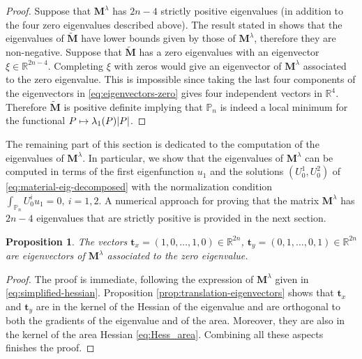 \documentclass[11pt]{article}
\numberwithin{equation}{section}\newtheorem*{jepEnonce}{\jepEnonceTitle}\newenvironment{enonce*}[1]{\def\jepEnonceTitle{#1}\jepEnonce}{\endjepEnonce}\newtheorem*{conj*}{Conjecture}
\def\mto{\mathchoice{\longmapsto}{\mapsto}{\mapsto}{\mapsto}}
\theoremstyle{plain}
\newtheorem{propo}[thm]{Proposition}
\theoremstyle{definition}
\newcommand{\bo}[1]{{\boldsymbol#1}}
\let\Bbb\mathbb
\def\Pp{{\mathbb{P}_n}}
\begin{document}
\begin{proof}
Suppose that $\bo M^\lambda$ has $2n-4$ strictly positive eigenvalues (in addition to the four zero eigenvalues described above). The result stated in \cite[Th.\,4.3.28]{horn-matrix} shows that the eigenvalues of $\widetilde{\bo{M}}$ have lower bounds given by those of $\bo M^\lambda$, therefore they are non-negative. Suppose that $\widetilde{\bo{M}}$ has a zero eigenvalues with an eigenvector $\xi\in \Bbb{R}^{2n-4}$. Completing $\xi$ with zeros would give an eigenvector of $\bo M^\lambda$ associated to the zero eigenvalue. This is impossible since taking the last four components of the eigenvectors in \eqref{eq:eigenvectors-zero} gives four independent vectors in $\Bbb{R}^4$. Therefore $\widetilde{\bo{M}}$ is positive definite implying that $\Pp$ is indeed a local minimum for the functional $P \mto \lambda_1(P)|P|$.
\end{proof}

The remaining part of this section is dedicated to the computation of the eigenvalues of $\bo M^\lambda$. In particular, we show that the eigenvalues of $\bo M^\lambda$ can be computed in terms of the first eigenfunction $u_1$ and the solutions $(U_0^1,U_0^2)$ of \eqref{eq:material-eig-decomposed} with the normalization condition $\int_{\Pp} U_0^i u_1 =0,\ i=1,2$. A numerical approach for proving that the matrix $\bo M^\lambda$ has $2n-4$ eigenvalues that are strictly positive is provided in the next section.

\begin{propo}
The vectors $\bo t_x = (1,0,\dots,1,0) \in \Bbb{R}^{2n}$, $\bo t_y = (0,1,\dots,0,1) \in \Bbb{R}^{2n}$ are eigenvectors of $\bo M^\lambda$ associated to the zero eigenvalue.
\label{prop:tx-ty}
\end{propo}

\begin{proof} The proof is immediate, following the expression of $\bo M^\lambda$ given in \eqref{eq:simplified-hessian}. Proposition \ref{prop:translation-eigenvectors} shows that $\bo t_x$ and $\bo t_y$ are in the kernel of the Hessian of the eigenvalue and are orthogonal to both the gradients of the eigenvalue and of the area. Moreover, they are also in the kernel of the area Hessian \eqref{eq:Hess_area}. Combining all these aspects finishes the proof.
\end{proof}
\end{document}
